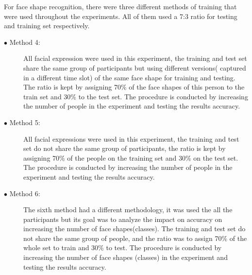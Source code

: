 \documentclass[]{article}
\begin{document}
For face shape recognition, there were three different methods of training that
were used throughout the experiments. All of them used a 7:3 ratio for testing 
and training set respectively.

\begin{description}
\item[$\bullet$ Method 4:] All facial expression were used in this experiment,
the training and test set share the same group of participants but using
different  versions( captured in a different time slot) of the same face shape
for training and testing. The ratio is kept by assigning 70\% of the face shapes
of this person to the train set and 30\% to the test set. The procedure is conducted
by increasing the number of people in the experiment and testing the results
accuracy.
\item[$\bullet$ Method 5:] All facial expressions were used in this experiment,
the training and test set do not  share the same group of participants, the
ratio is kept by assigning 70\% of the people on the training set and 30\% on the
test set. The procedure is conducted by increasing the number of people in the
experiment and testing the results accuracy.
\item[$\bullet$ Method 6:] The sixth method had a different methodology, it was
used the all the participants but its goal was to analyze the impact on accuracy
on increasing the number of face shapes(classes).  The training and test set do
not share the same group of people, and the ratio was to assign 70\% of the whole set to
train and 30\% to test. The procedure is conducted by increasing the number of
face shapes (classes) in the experiment and testing the results accuracy.
\end{description}
\end{document}
